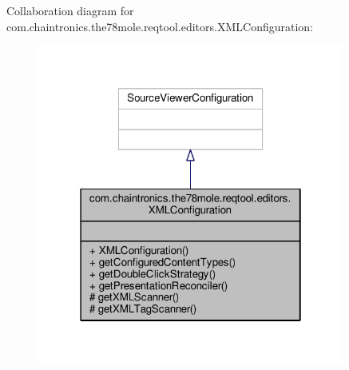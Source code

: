 Collaboration diagram for com.\+chaintronics.\+the78mole.\+reqtool.\+editors.\+X\+M\+L\+Configuration\+:\nopagebreak
\begin{figure}[H]
\begin{center}
\leavevmode
\includegraphics[width=286pt]{d1/ded/classcom_1_1chaintronics_1_1the78mole_1_1reqtool_1_1editors_1_1XMLConfiguration__coll__graph}
\end{center}
\end{figure}

